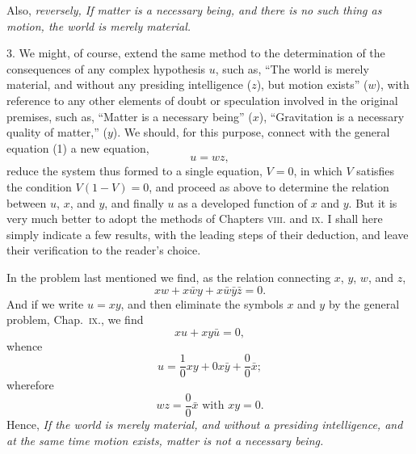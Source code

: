 \documentclass[oneside]{book}
\begin{document}
Also, \textit{reversely, If matter is a necessary being, and there is no
such thing as motion, the world is merely material.}

3. We might, of course, extend the same method to the
determination of the consequences of any complex hypothesis $u$,
such as, ``The world is merely material, and without any presiding
intelligence ($z$), but motion exists'' ($w$), with reference to
any other elements of doubt or speculation involved in the original
premises, such as, ``Matter is a necessary being'' ($x$), ``Gravitation
is a necessary quality of matter,'' ($y$). We should, for
this purpose, connect with the general equation (1) a new
equation,
\begin{equation*}
u = wz,
\end{equation*}
reduce the system thus formed to a single equation, $V=0$, in
which $V$ satisfies the condition $V(1-V) = 0$, and proceed as
above to determine the relation between $u$, $x$, and $y$, and finally $u$
as a developed function of $x$ and $y$. But it is very much better
to adopt the methods of Chapters \textsc{viii.} and \textsc{ix.} I shall here
simply indicate a few results, with the leading steps of their deduction,
and leave their verification to the reader's choice.

In the problem last mentioned we find, as the relation connecting
$x$, $y$, $w$, and $z$,
\begin{equation*}
xw + x\bar{w}y + x\bar{w}\bar{y}\bar{z} = 0.
\end{equation*}
And if we write $u = xy$, and then eliminate the symbols $x$ and $y$
by the general problem, Chap.~\textsc{ix.}, we find
\begin{equation*}
xu + xy\bar{u} = 0,
\end{equation*}
whence
\begin{equation*}
u=\frac{1}{0}xy+0x\bar{y}+\frac{0}{0}\bar{x};
\end{equation*}
wherefore
\begin{equation*}
wz=\frac{0}{0}\bar{x}\text{ with }xy=0.
\end{equation*}
Hence, \textit{If the world is merely material, and without a presiding
intelligence, and at the same time motion exists, matter is not a necessary
being.}
\end{document}
